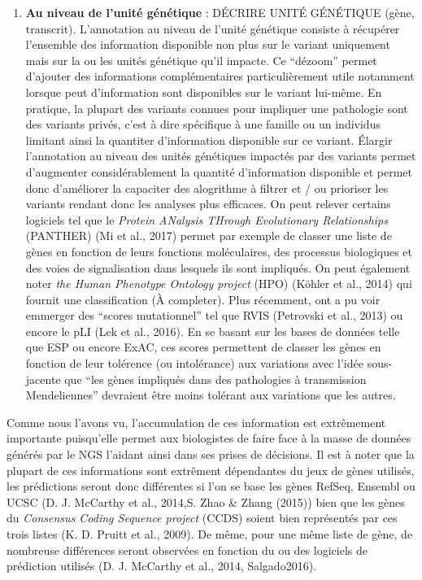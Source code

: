 \documentclass[12pt,twoside]{reedthesis}
\providecommand{\tightlist}{%
  \setlength{\itemsep}{0pt}\setlength{\parskip}{0pt}}
\theoremstyle{definition}
\theoremstyle{definition}
\theoremstyle{remark}
\begin{document}
  \begin{enumerate}
  \def\labelenumi{\arabic{enumi}.}
  \setcounter{enumi}{1}
  \tightlist
  \item
    \textbf{Au niveau de l'unité génétique} : DÉCRIRE UNITÉ GÉNÉTIQUE
    (gène, transcrit). L'annotation au niveau de l'unité génétique
    consiste à récupérer l'ensemble des information disponible non plus
    sur le variant uniquement mais sur la ou les unités génétique qu'il
    impacte. Ce ``dézoom'' permet d'ajouter des informations
    complémentaires particulièrement utile notamment lorsque peut
    d'information sont disponibles sur le variant lui-même. En pratique,
    la plupart des variants connues pour impliquer une pathologie sont des
    variants privés, c'est à dire spécifique à une famille ou un individus
    limitant ainsi la quantiter d'information disponible sur ce variant.
    Élargir l'annotation au niveau des unités génétiques impactés par des
    variants permet d'augmenter considérablement la quantité d'information
    disponible et permet donc d'améliorer la capaciter des alogrithme à
    filtrer et / ou prioriser les variants rendant donc les analyses plus
    efficaces. On peut relever certains logiciels tel que le \emph{Protein
    ANalysis THrough Evolutionary Relationships} (PANTHER) (Mi et al.,
    2017) permet par exemple de classer une liste de gènes en fonction de
    leurs fonctions moléculaires, des processus biologiques et des voies
    de signalisation dans lesquels ils sont impliqués. On peut également
    noter \emph{the Human Phenotype Ontology project} (HPO) (Köhler et
    al., 2014) qui fournit une classification (À completer). Plus
    récemment, ont a pu voir emmerger des ``scores mutationnel'' tel que
    RVIS (Petrovski et al., 2013) ou encore le pLI (Lek et al., 2016). En
    se basant sur les bases de données telle que ESP ou encore ExAC, ces
    scores permettent de classer les gènes en fonction de leur tolérence
    (ou intolérance) aux variations avec l'idée sous-jacente que ``les
    gènes impliqués dans des pathologies à transmission Mendeliennes''
    devraient être moins tolérant aux variations que les autres.
  \end{enumerate}
  
  Comme nous l'avons vu, l'accumulation de ces information est extrêmement
  importante puisqu'elle permet aux biologistes de faire face à la masse
  de données générés par le NGS l'aidant ainsi dans ses prises de
  décisions. Il est à noter que la plupart de ces informations sont
  extrêment dépendantes du jeux de gènes utilisés, les prédictions seront
  donc différentes si l'on se base les gènes RefSeq, Ensembl ou UCSC (D.
  J. McCarthy et al., 2014,S. Zhao \& Zhang (2015)) bien que les gènes du
  \emph{Consensus Coding Sequence project} (CCDS) soient bien représentés
  par ces trois listes (K. D. Pruitt et al., 2009). De même, pour une même
  liste de gène, de nombreuse différences seront observées en fonction du
  ou des logiciels de prédiction utilisés (D. J. McCarthy et al., 2014,
  Salgado2016).
  
\end{document}

